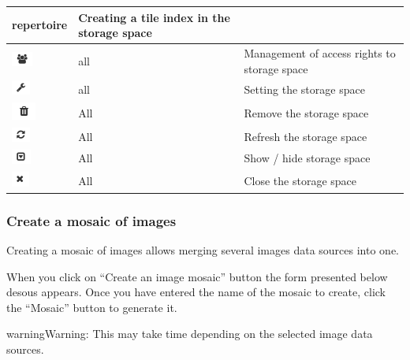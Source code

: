 \documentclass[letterpaper,10pt,english]{sphinxmanual}
\begin{document}
\begin{tabulary}{\linewidth}{|L|L|L|}
repertoire
 & 
Creating a tile index in the storage space
\\
\hline
\includegraphics{privileges.png}
 & 
all
 & 
Management of access rights to storage space
\\
\hline
\includegraphics{configuration.png}
 & 
all
 & 
Setting the storage space
\\
\hline
\includegraphics{delete.png}
 & 
All
 & 
Remove the storage space
\\
\hline
\includegraphics{refresh.png}
 & 
All
 & 
Refresh the storage space
\\
\hline
\includegraphics{toggle1.png}
 & 
All
 & 
Show / hide storage space
\\
\hline
\includegraphics{close.png}
 & 
All
 & 
Close the storage space
\\
\hline\end{tabulary}



\subsubsection{Create a mosaic of images}
\label{data/datastores:creer-une-mosaique-d-images}
Creating a mosaic of images allows merging several images data sources into one.

When you click on ``Create an image mosaic'' button the form presented below desous appears. Once you have entered the name of the mosaic to create, click the ``Mosaic'' button to generate it.

\begin{notice}{warning}{Warning:}
This may take time depending on the selected image data sources.
\end{notice}
\end{document}
